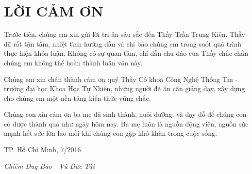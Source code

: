 \newpage
\chapter*{LỜI CẢM ƠN}
Trước tiên, chúng em xin gửi lời tri ân sâu sắc đến Thầy Trần Trung Kiên. Thầy đã rất tận tâm, nhiệt tình hướng dẫn và chỉ bảo chúng em trong suốt quá trình thực hiện khóa luận. Không có sự quan tâm, chỉ dẫn chu đáo của Thầy chắc chắn chúng em không thể hoàn thành luận văn này.

Chúng em xin chân thành cảm ơn quý Thầy Cô khoa Công Nghệ Thông Tin - trường đại học Khoa Học Tự Nhiên, những người đã ân cần giảng dạy, xây dựng cho chúng em một nền tảng kiến thức vững chắc. 

Chúng con xin cảm ơn ba mẹ đã sinh thành, nuôi dưỡng, và dạy dỗ để chúng con có được thành quả như ngày hôm nay. Ba mẹ luôn là nguồn động viên, nguồn sức mạnh hết sức lớn lao mỗi khi chúng con gặp khó khăn trong cuộc sống.

\hfill TP. Hồ Chí Minh, 7/2016

\hfill \textit{Chiêm Duy Bảo - Vũ Đức Tài}
